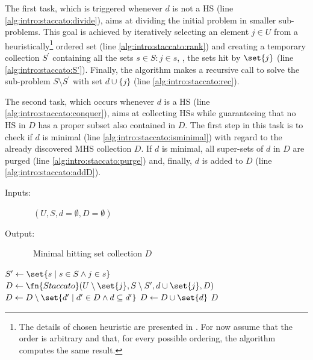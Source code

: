 The first task, which is triggered whenever $d$ is not a \ac{HS} (line
\ref{alg:intro:staccato:divide}), aims at dividing the initial
problem in smaller sub-problems.
%
This goal is achieved by iteratively selecting an element $j \in U$
from a heuristically\footnote{The details of chosen heuristic are
  presented in . For now assume that the
  order is arbitrary and that, for every possible ordering, the
  algorithm computes the same result.} ordered set (line
\ref{alg:intro:staccato:rank}) and creating a temporary collection
$S^\prime$
containing all the sets $s \in S : j \in s$,
\ie, the sets hit by $\set{j}$ (line \ref{alg:intro:staccato:S'}).
%
Finally, the algorithm makes a recursive call to solve the sub-problem
$S \setminus S^\prime$ with set $d \cup \{j\}$ (line
\ref{alg:intro:staccato:rec}).

The second task, which occurs whenever $d$ is a \ac{HS} (line
\ref{alg:intro:staccato:conquer}), aims at collecting \acp{HS}
while guaranteeing that no \ac{HS} in $D$ has a proper subset also
contained in $D$.
%
The first step in this task is to check if $d$ is minimal (line
\ref{alg:intro:staccato:isminimal}) with regard to the already
discovered \ac{MHS} collection $D$.
%
If $d$ is minimal, all super-sets of $d$ in $D$ are purged (line
\ref{alg:intro:staccato:purge}) and, finally, $d$ is added to
$D$ (line \ref{alg:intro:staccato:addD}).

\begin{algorithm}
  \begin{description}
  \item[Inputs:]\ $(U, S, d=\emptyset, D=\emptyset)$
  \item[Output:]\ Minimal hitting set collection $D$
  \end{description}

  \begin{algorithmic}[1]
        \label{alg:intro:staccato:divide}
     \label{alg:intro:staccato:rank}
    \State $S^\prime \gets \set{s \mid s \in S \wedge j \in s}$  \label{alg:intro:staccato:S'}
    \State $D \gets \fn{Staccato}(U \setminus \set{j}, S \setminus S^\prime, d \cup \set{j}, D)$  \label{alg:intro:staccato:rec}
    \EndFor
    \Else
     \label{alg:intro:staccato:conquer}
     \label{alg:intro:staccato:isminimal}
    \State $D \gets D \setminus \set{d^\prime \mid d^\prime \in D \wedge  d \subseteq d^\prime}$  \label{alg:intro:staccato:purge}
    \State $D \gets D \cup \set{d}$ \label{alg:intro:staccato:addD}
    \EndIf
    \EndIf
    \State \Return $D$
  \end{algorithmic}
  \caption{\staccato{}\label{alg:intro:staccato}}
\end{algorithm}

